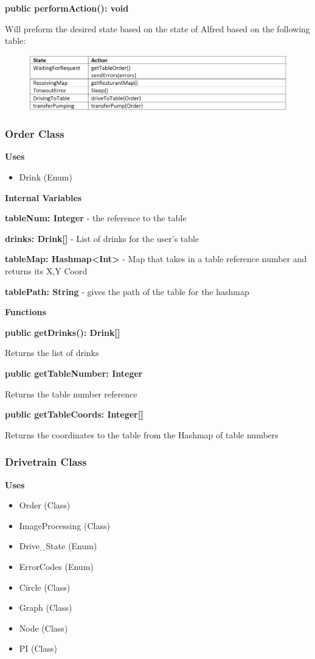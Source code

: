 \documentclass [10pt]{article}
\begin{document}
\textbf{public performAction(): void}

Will preform the desired state based on the state of Alfred based on the following table:
\begin{figure} [h!]
	\centering
	\includegraphics [scale = 0.4] {figures/AlfredSystem_PerformAction.png}
\end{figure}
\subsubsection{Order Class}
\textbf{Uses}
\begin{itemize}
	\item Drink (Enum)
\end{itemize}


\textbf{Internal Variables}

\textbf{tableNum: Integer} - the reference to the table

\textbf{drinks: Drink[]} - List of drinks for the user's table

\textbf{tableMap: Hashmap<Int>} -  Map that takes in a table reference number and returns its X,Y Coord

\textbf{tablePath: String} - gives the path of the table for the hashmap 

\textbf{Functions}

\textbf{public getDrinks(): Drink[]}

Returns the list of drinks

\textbf{public getTableNumber: Integer}

Returns the table number reference

\textbf{public getTableCoords: Integer[]}

Returns the coordinates to the table from the Hashmap of table numbers

\subsubsection{Drivetrain Class}
\textbf{Uses}
\begin{itemize}
	\item Order (Class)
	\item ImageProcessing (Class)
	\item Drive\_State (Enum)
	\item ErrorCodes (Enum)
	\item Circle (Class)
	\item Graph (Class)
	\item Node (Class)
	\item PI (Class)
\end{itemize}
\end{document}
